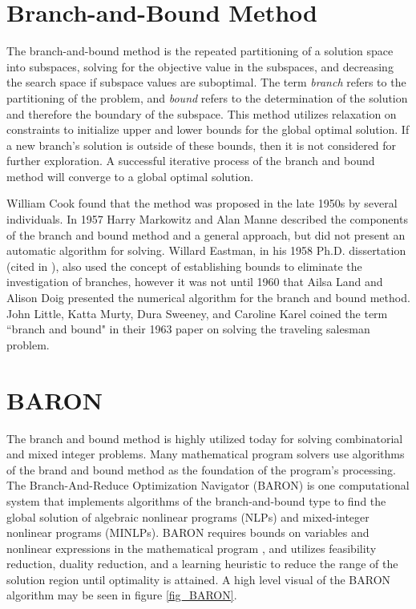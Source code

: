 \section{Branch-and-Bound Method}
The branch-and-bound method is the repeated partitioning of a solution space into subspaces, solving for the objective value in the subspaces, and decreasing the search space if subspace values are suboptimal. The term \textit{branch} refers to the partitioning of the problem, and \textit{bound} refers to the determination of the solution and therefore the boundary of the subspace. This method utilizes relaxation on constraints to initialize upper and lower bounds for the global optimal solution.  If a new branch's solution is outside of these bounds, then it is not considered for further exploration.  A successful iterative process of the branch and bound method will converge to a global optimal solution. \par 
 William Cook \cite{Cook2012MarkowitzBound} found that the method was proposed in the late 1950s by several individuals. In 1957 Harry Markowitz and Alan Manne described the components of the branch and bound method and a general approach, but did not present an automatic algorithm for solving. Willard Eastman, in his 1958 Ph.D. dissertation (cited in \cite{Cook2012MarkowitzBound}), also used the concept of establishing bounds to eliminate the investigation of branches, however it was not until 1960 that Ailsa Land and Alison Doig \cite{Land2010AnProblems} presented the numerical algorithm for the branch and bound method. John Little, Katta Murty, Dura Sweeney, and Caroline Karel \cite{Little1963AnProblem} coined the term ``branch and bound" in their 1963 paper on solving the traveling salesman problem. \par
 \section{BARON}
The branch and bound method is highly utilized today for solving combinatorial and mixed integer problems. Many mathematical program solvers use algorithms of the brand and bound method as the foundation of the program's processing.  The Branch-And-Reduce Optimization Navigator (BARON) is one computational system that implements algorithms of the branch-and-bound type to find the global solution of algebraic nonlinear programs (NLPs) and mixed-integer nonlinear programs (MINLPs). BARON requires bounds on variables and nonlinear expressions in the mathematical program \cite{BARON_UserManual}, and utilizes feasibility reduction, duality reduction, and a learning heuristic \cite{Tawarmalani2004GlobalStudy} to reduce the range of the solution region until optimality is attained. A high level visual of the BARON algorithm may be seen in figure \ref{fig_BARON}.   

